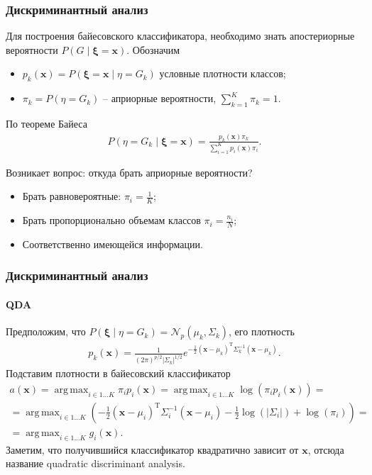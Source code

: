 \documentclass{beamer}
\DeclareMathOperator*{\argmax}{arg\,max}
\begin{document}
\begin{frame}
  \frametitle{Дискриминантный анализ}

  Для построения байесовского классификатора, необходимо знать апостериорные вероятности $P(G \mid \boldsymbol{\xi} = \mathbf{x})$. Обозначим
  \begin{itemize}
    \item  $p_k(\mathbf{x}) = P(\boldsymbol{\xi} = \mathbf{x} \mid \eta = G_k)$ условные плотности классов;
    \item $\pi_k = P(\eta = G_k)$ -- априорные вероятности, $\sum_{k = 1}^{K} \pi_k = 1$.
  \end{itemize}
  \bigskip
  По теореме Байеса
  \begin{align*}
     P(\eta = G_k \mid \boldsymbol{\xi} = \mathbf{x}) = \frac{p_k(\mathbf{x}) \pi_k}{\sum_{i = 1}^K p_i(\mathbf{x})\pi_i}.
  \end{align*}

  Возникает вопрос: откуда брать априорные вероятности?
  \begin{itemize}
    \item Брать равновероятные: $\pi_i = \frac{1}{K}$;
    \item Брать пропорционально объемам классов $\pi_i = \frac{n_i}{N}$;
    \item Соответственно имеющейся информации.
  \end{itemize}
\end{frame}
\begin{frame}
  \frametitle{Дискриминантный анализ}
  \framesubtitle{QDA}
  Предположим, что $P(\boldsymbol{\xi} \mid \eta = G_k) = \mathcal{N}_p(\mu_k, \Sigma_k)$, его плотность
  \begin{align*}
    p_k(\mathbf{x}) = \frac{1}{(2\pi)^{p/2} \lvert \Sigma_k \rvert^{1/2}} e^{-\frac{1}{2}(\mathbf{x} - \mu_k)^\mathrm{T} \Sigma_k^{-1}(\mathbf{x} - \mu_k)}.
  \end{align*}
  Подставим плотности в байесовский классификатор
  \begin{multline*}
    a(\mathbf{x}) = \argmax_{i \in 1 \ldots K} \pi_i p_i(\mathbf{x}) = \argmax_{i \in 1 \ldots K} \log(\pi_i p_i(\mathbf{x})) = \\
    = \argmax_{i \in 1 \ldots K}(-\frac{1}{2}(\mathbf{x} - \mu_i)^\mathrm{T} \Sigma_i^{-1}(\mathbf{x} - \mu_i) - \frac{1}{2}\log(\lvert \Sigma_i \rvert) + \log(\pi_i)) = \\= \argmax_{i \in 1 \ldots K} g_i(\mathbf{x}).
  \end{multline*}
  Заметим, что получившийся классификатор квадратично зависит от $\mathbf{x}$, отсюда название quadratic discriminant analysis.
\end{frame}
\end{document}
